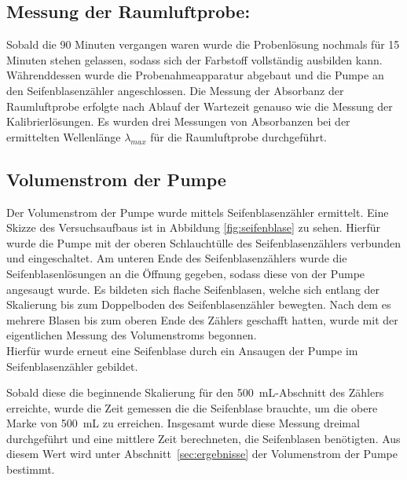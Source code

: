 \subsection*{Messung der Raumluftprobe:}
Sobald die 90 Minuten vergangen waren wurde die Probenlösung nochmals für 15 Minuten stehen gelassen, sodass sich der Farbstoff vollständig ausbilden kann. Währenddessen wurde die Probenahmeapparatur abgebaut und die Pumpe an den Seifenblasenzähler angeschlossen.
Die Messung der Absorbanz der Raumluftprobe erfolgte nach Ablauf der Wartezeit genauso wie die Messung der Kalibrierlösungen. Es wurden drei Messungen von Absorbanzen bei der ermittelten Wellenlänge $\lambda_{max}$ für die Raumluftprobe durchgeführt.

\subsection*{Volumenstrom der Pumpe}
Der Volumenstrom der Pumpe wurde mittels Seifenblasenzähler ermittelt. Eine Skizze des Versuchsaufbaus ist in Abbildung \ref{fig:seifenblase} zu sehen. Hierfür wurde die Pumpe mit der oberen Schlauchtülle des Seifenblasenzählers verbunden und eingeschaltet. Am unteren Ende des Seifenblasenzählers wurde die Seifenblasenlösungen an die Öffnung gegeben, sodass diese von der Pumpe angesaugt wurde. Es bildeten sich flache Seifenblasen, welche sich entlang der Skalierung bis zum Doppelboden des Seifenblasenzähler bewegten. Nach dem es mehrere Blasen bis zum oberen Ende des Zählers geschafft hatten, wurde mit der eigentlichen Messung des Volumenstroms begonnen.\\
Hierfür wurde erneut eine Seifenblase durch ein Ansaugen der Pumpe im Seifenblasenzähler gebildet. 
\newpage

Sobald diese die beginnende Skalierung für den \SI{500}{\milli \liter}-Abschnitt des Zählers erreichte, wurde die Zeit gemessen die die Seifenblase brauchte, um die obere Marke von \SI{500}{\milli \liter} zu erreichen. Insgesamt wurde diese Messung dreimal durchgeführt und eine mittlere Zeit berechneten, die Seifenblasen benötigten. Aus diesem Wert wird unter \mbox{Abschnitt \ref{sec:ergebnisse}} der Volumenstrom der Pumpe bestimmt.

